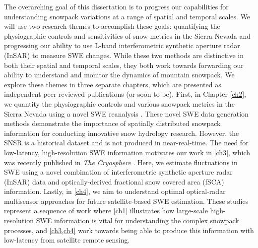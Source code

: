 The overarching goal of this dissertation is to progress our capabilities for understanding snowpack variations at a range of spatial and temporal scales. We will use two research themes to accomplish these goals: quantifying the physiographic controls and sensitivities of snow metrics in the Sierra Nevada and progressing our ability to use L-band interferometric synthetic aperture radar (InSAR) to measure SWE changes. While these two methods are distinctive in both their spatial and temporal scales, they both work towards forwarding our ability to understand and monitor the dynamics of mountain snowpack. We explore these themes in three separate chapters, which are presented as independent peer-reviewed publications (or soon-to-be). First, in Chapter \ref{ch2}, we quantity the physiographic controls and various snowpack metrics in the Sierra Nevada using a novel SWE reanalysis \citep{margulisLandsatEraSierraNevada2016}. These novel SWE data generation methods demonstrate the importance of spatially distributed snowpack information for conducting innovative snow hydrology research. However, the SNSR is a historical dataset and is not produced in near-real-time. The need for low-latency, high-resolution SWE information motivates our work in \ref{ch3}, which was recently published in \emph{The Cryosphere} \citep{tarriconeEstimatingSnowAccumulation2023a}. Here, we estimate fluctuations in SWE using a novel combination of interferometric synthetic aperture radar (InSAR) data and optically-derived fractional snow covered area (fSCA) information. Lastly, in \ref{ch4}, we aim to understand optimal optical-radar multisensor approaches for future satellite-based SWE estimation. These studies represent a sequence of work where \ref{ch1} illustrates how large-scale high-resolution SWE information is vital for understanding the complex snowpack processes, and \ref{ch3,ch4} work towards being able to produce this information with low-latency from satellite remote sensing.

